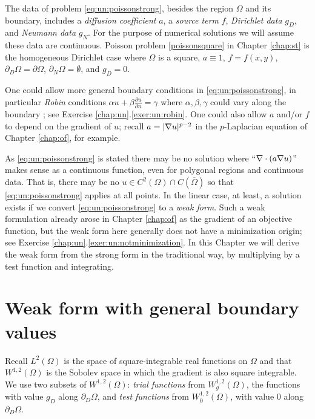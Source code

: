 The data of problem \eqref{eq:un:poissonstrong}, besides the region $\Omega$ and its boundary, includes a \emph{diffusion coefficient} $a$, a \emph{source term} $f$, \emph{Dirichlet data} $g_D$, and \emph{Neumann data} $g_N$.  For the purpose of numerical solutions we will assume these data are continuous.  Poisson problem \eqref{poissonsquare} in Chapter \ref{chap:st} is the homogeneous Dirichlet case where $\Omega$ is a square, $a\equiv 1$, $f=f(x,y)$, $\partial_D \Omega = \partial \Omega$, $\partial_N \Omega = \emptyset$, and $g_D=0$.

One could allow more general boundary conditions in \eqref{eq:un:poissonstrong}, in particular \emph{Robin} conditions $\alpha u + \beta \frac{\partial u}{\partial n} = \gamma$ where $\alpha,\beta,\gamma$ could vary along the boundary \citep{Elmanetal2005}; see Exercise \ref{chap:un}.\ref{exer:un:robin}.  One could also allow $a$ and/or $f$ to depend on the gradient of $u$; recall $a=|\nabla u|^{p-2}$ in the $p$-Laplacian equation of Chapter \ref{chap:of}, for example.

As \eqref{eq:un:poissonstrong} is stated there may be no solution where ``$\nabla\cdot(a\nabla u)$'' makes sense as a continuous function, even for polygonal regions and continuous data.  That is, there may be no $u\in C^2(\Omega) \cap C(\overline \Omega)$ so that \eqref{eq:un:poissonstrong} applies at all points.  In the linear case, at least, a solution exists if we convert \eqref{eq:un:poissonstrong} to a \emph{weak form}.  Such a weak formulation already arose in Chapter \ref{chap:of} as the gradient of an objective function, but the weak form here generally does not have a minimization origin; see Exercise \ref{chap:un}.\ref{exer:un:notminimization}.  In this Chapter we will derive the weak form from the strong form in the traditional way, by multiplying by a test function and integrating.


\section{Weak form with general boundary values}

Recall $L^2(\Omega)$ is the space of square-integrable real functions on $\Omega$ and that $W^{1,2}(\Omega)$ is the Sobolev space in which the gradient is also square integrable.  We use two subsets of $W^{1,2}(\Omega)$: \emph{trial functions} from $W^{1,2}_g(\Omega)$, the functions with value $g_D$ along $\partial_D \Omega$, and \emph{test functions} from $W^{1,2}_0(\Omega)$, with value $0$ along $\partial_D \Omega$.

